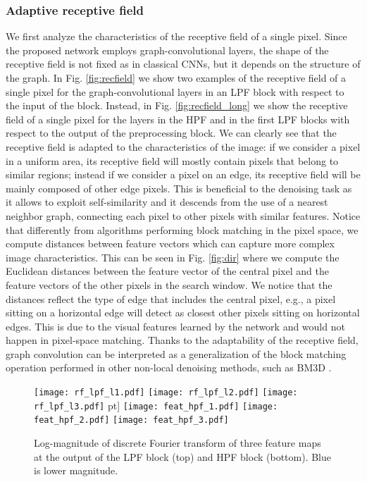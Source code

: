 \documentclass[journal]{IEEEtran}
\begin{document}
\subsubsection{Adaptive receptive field}
We first analyze the characteristics of the receptive field of a single pixel. Since the proposed network employs graph-convolutional layers, the shape of the receptive field is not fixed as in classical CNNs, but it depends on the structure of the graph. In Fig. \ref{fig:recfield} we show two examples of the receptive field of a single pixel for the graph-convolutional layers in an LPF block with respect to the input of the block. Instead, in Fig. \ref{fig:recfield_long} we show the receptive field of a single pixel for the layers in the HPF and in the first LPF blocks with respect to the output of the preprocessing block. We can clearly see that the receptive field is adapted to the characteristics of the image: if we consider a pixel in a uniform area, its receptive field will mostly contain pixels that belong to similar regions; instead if we consider a pixel on an edge, its receptive field will be mainly composed of other edge pixels. This is beneficial to the denoising task as it allows to exploit self-similarity and it descends from the use of a nearest neighbor graph, connecting each pixel to other pixels with similar features. Notice that differently from algorithms performing block matching in the pixel space, we compute distances between feature vectors which can capture more complex image characteristics. This can be seen in Fig. \ref{fig:dir} where we compute the Euclidean distances between the feature vector of the central pixel and the feature vectors of the other pixels in the search window. We notice that the distances reflect the type of edge that includes the central pixel, e.g., a pixel sitting on a horizontal edge will detect as closest other pixels sitting on horizontal edges. This is due to the visual features learned by the network and would not happen in pixel-space matching.
Thanks to the adaptability of the receptive field, graph convolution can be interpreted as a generalization of the block matching operation performed in other non-local denoising methods, such as BM3D \cite{dabov2007image}.


\begin{figure}
\centering
\texttt{[image: rf\_lpf\_l1.pdf]}
\texttt{[image: rf\_lpf\_l2.pdf]}
\texttt{[image: rf\_lpf\_l3.pdf]}
\6pt]
\texttt{[image: feat\_hpf\_1.pdf]}
\texttt{[image: feat\_hpf\_2.pdf]}
\texttt{[image: feat\_hpf\_3.pdf]}
\caption{Log-magnitude of discrete Fourier transform of three feature maps at the output of the LPF block (top) and HPF block (bottom). Blue is lower magnitude.}
\label{fig:filters}
\end{figure}
\end{document}
